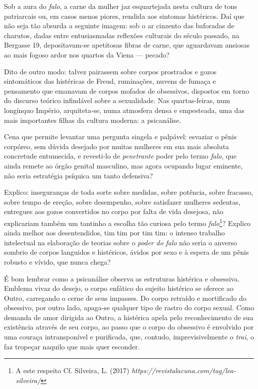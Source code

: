 Sob a aura do \emph{falo}, a carne da mulher jaz esquartejada nesta
cultura de tons patriarcais ou, em casos menos piores, rendida aos
sintomas histéricos. Daí que não seja tão absurda a seguinte imagem: sob
o ar cinzento das baforadas de charutos, dadas entre entusiasmadas
reflexões culturais do século passado, na Bergasse 19, depositavam-se
apetitosas fibras de carne, que aguardavam ansiosas ao mais fogoso ardor
nos quartos da Viena --- pecado?

Dito de outro modo: talvez pairassem sobre corpos prostrados e gozos
sintomáticos das histéricas de Freud, ruminações, nuvens de fumaça e
pensamento que emanavam de corpos mofados de obsessivos, dispostos em
torno do discurso teórico infindável sobre a sexualidade. Nas
quartas-feiras, num longínquo Império, arquiteta-se, numa atmosfera
densa e empesteada, uma das mais importantes filhas da cultura moderna:
a psicanálise.

Cena que permite levantar uma pergunta singela e palpável: esvaziar o
pênis corpóreo, sem dúvida desejado por muitas mulheres em sua mais
absoluta concretude entumecida, e revesti-lo de \emph{penetrante} poder
pelo termo \emph{falo}, que ainda remete ao órgão genital masculino, mas
agora ocupando lugar eminente, não seria estratégia psíquica um tanto
defensiva?

Explico: inseguranças de toda sorte sobre medidas, sobre potência, sobre
fracasso, sobre tempo de ereção, sobre desempenho, sobre satisfazer
mulheres sedentas, entregues aos gozos convertidos no corpo por falta de
vida desejosa, não explicariam também um tantinho a escolha tão curiosa
pelo termo \emph{falo}\footnote{A este respeito Cf. Silveira, L. (2017)
  \emph{https://revistalacuna.com/tag/lea-silveira/}}?
Explico ainda melhor aos desentendidos, tim tim por tim tim: o intenso
trabalho intelectual na elaboração de teorias sobre o \emph{poder do
falo} não seria o anverso sombrio de corpos languidos e histéricos,
ávidos por sexo e à espera de um pênis robusto e vívido, que nunca
chega?

É bom lembrar como a psicanálise observa as estruturas histérica e
obsessiva. Emblema vivaz do desejo, o corpo enfático do sujeito
histérico se oferece ao Outro, carregando o cerne de seus impasses. Do
corpo retraído e mortificado do obsessivo, por outro lado, apaga-se
qualquer tipo de rastro do corpo sexual. Como demanda de amor dirigida
ao Outro, a histérica apela pelo reconhecimento de sua existência
através de seu corpo, ao passo que o corpo do obsessivo é envolvido por
uma couraça intransponível e purificada, que, contudo, imprevisivelmente
o \emph{trai}, o faz tropeçar naquilo que mais quer esconder.

